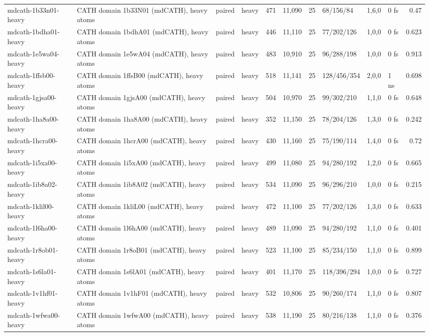 \documentclass[10pt]{article}
\begin{document}
\begin{small}
\begin{longtable}{p{3.9cm}p{5.2cm}llrrrlrlr}
mdcath-1b33n01-heavy & CATH domain 1b33N01 (mdCATH), heavy atoms & paired & heavy & 471 & 11,090 & 25 & 68/156/84 & 1,6,0 & 0 fs & 0.47\\
mdcath-1bdha01-heavy & CATH domain 1bdhA01 (mdCATH), heavy atoms & paired & heavy & 446 & 11,110 & 25 & 77/202/126 & 1,0,0 & 0 fs & 0.623\\
mdcath-1e5wa04-heavy & CATH domain 1e5wA04 (mdCATH), heavy atoms & paired & heavy & 483 & 10,910 & 25 & 96/288/198 & 1,0,0 & 0 fs & 0.913\\
mdcath-1ffsb00-heavy & CATH domain 1ffsB00 (mdCATH), heavy atoms & paired & heavy & 518 & 11,141 & 25 & 128/456/354 & 2,0,0 & 1 ns & 0.698\\
mdcath-1gjsa00-heavy & CATH domain 1gjsA00 (mdCATH), heavy atoms & paired & heavy & 504 & 10,970 & 25 & 99/302/210 & 1,1,0 & 0 fs & 0.648\\
mdcath-1ha8a00-heavy & CATH domain 1ha8A00 (mdCATH), heavy atoms & paired & heavy & 352 & 11,150 & 25 & 78/204/126 & 1,3,0 & 0 fs & 0.242\\
mdcath-1hcra00-heavy & CATH domain 1hcrA00 (mdCATH), heavy atoms & paired & heavy & 430 & 11,160 & 25 & 75/190/114 & 1,4,0 & 0 fs & 0.72\\
mdcath-1i5xa00-heavy & CATH domain 1i5xA00 (mdCATH), heavy atoms & paired & heavy & 499 & 11,080 & 25 & 94/280/192 & 1,2,0 & 0 fs & 0.665\\
mdcath-1ib8a02-heavy & CATH domain 1ib8A02 (mdCATH), heavy atoms & paired & heavy & 534 & 11,090 & 25 & 96/296/210 & 1,0,0 & 0 fs & 0.215\\
mdcath-1klil00-heavy & CATH domain 1kliL00 (mdCATH), heavy atoms & paired & heavy & 472 & 11,100 & 25 & 77/202/126 & 1,3,0 & 0 fs & 0.633\\
mdcath-1l6ha00-heavy & CATH domain 1l6hA00 (mdCATH), heavy atoms & paired & heavy & 489 & 11,090 & 25 & 94/280/192 & 1,1,0 & 0 fs & 0.401\\
mdcath-1r8ob01-heavy & CATH domain 1r8oB01 (mdCATH), heavy atoms & paired & heavy & 523 & 11,100 & 25 & 85/234/150 & 1,1,0 & 0 fs & 0.899\\
mdcath-1s6la01-heavy & CATH domain 1s6lA01 (mdCATH), heavy atoms & paired & heavy & 401 & 11,170 & 25 & 118/396/294 & 1,0,0 & 0 fs & 0.727\\
mdcath-1v1hf01-heavy & CATH domain 1v1hF01 (mdCATH), heavy atoms & paired & heavy & 532 & 10,806 & 25 & 90/260/174 & 1,1,0 & 0 fs & 0.807\\
mdcath-1wfwa00-heavy & CATH domain 1wfwA00 (mdCATH), heavy atoms & paired & heavy & 538 & 11,190 & 25 & 80/216/138 & 1,1,0 & 0 fs & 0.376\\

\end{longtable}
\end{small}
\end{document}

